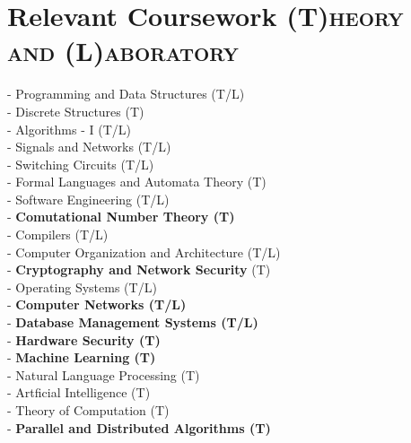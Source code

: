 \section{Relevant Coursework
\hfill\small\textsc{(T)heory and (L)aboratory}}

\begin{multicols}{2}
- Programming and Data Structures (T/L) \\
- Discrete Structures (T) \\
- Algorithms - I (T/L) \\
- Signals and Networks (T/L) \\
- Switching Circuits (T/L) \\
- Formal Languages and Automata Theory (T) \\
- Software Engineering (T/L) \\
- \textbf{Comutational Number Theory (T)}\\
- Compilers (T/L) \\
- Computer Organization and Architecture (T/L)\\
- \textbf{Cryptography and Network Security} (T) \\
- Operating Systems (T/L) \\
- \textbf{Computer Networks (T/L)} \\
- \textbf{Database Management Systems (T/L)} \\
- \textbf{Hardware Security (T)} \\
- \textbf{Machine Learning (T)} \\
- Natural Language Processing (T) \\
- Artficial Intelligence (T) \\
- Theory of Computation (T)\\
- \textbf{Parallel and Distributed Algorithms (T)}\\
\end{multicols}